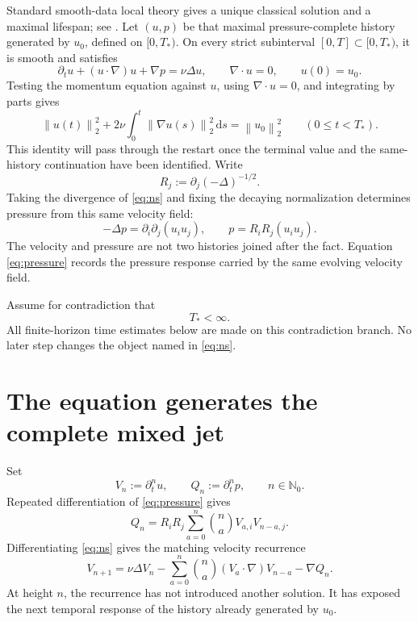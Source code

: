 \documentclass[11pt,letterpaper]{article}
\theoremstyle{definition}
\theoremstyle{remark}
\newcommand{\Nzero}{\mathbb N_0}
\newcommand{\norm}[1]{\left\lVert #1\right\rVert}
\newcommand{\dd}{\,\mathrm d}
\begin{document}
Standard smooth-data local theory gives a unique classical solution and a
maximal lifespan; see \cite{FujitaKato1964,Kato1984}.  Let \((u,p)\) be that
maximal pressure-complete history generated by \(u_0\), defined on
\([0,T_*)\).  On every strict subinterval \([0,T]\subset[0,T_*)\), it is
smooth and satisfies
\begin{equation}
\partial_tu+(u\cdot\nabla)u+\nabla p=\nu\Delta u,
\qquad
\nabla\cdot u=0,
\qquad
u(0)=u_0.
\label{eq:ns}
\end{equation}
Testing the momentum equation against \(u\), using
\(\nabla\cdot u=0\), and integrating by parts gives
\begin{equation}
\norm{u(t)}_2^2
+2\nu\int_0^t\norm{\nabla u(s)}_2^2\dd s
=\norm{u_0}_2^2
\qquad(0\le t<T_*).
\label{eq:energy-before-endpoint}
\end{equation}
This identity will pass through the restart once the terminal value and the
same-history continuation have been identified.
Write
\[
R_j:=\partial_j(-\Delta)^{-1/2}.
\]
Taking the divergence of \eqref{eq:ns} and fixing the decaying normalization
determines pressure from this same velocity field:
\begin{equation}
-\Delta p=\partial_i\partial_j(u_i u_j),
\qquad
p=R_iR_j(u_i u_j).
\label{eq:pressure}
\end{equation}
The velocity and pressure are not two histories joined after the fact.
Equation \eqref{eq:pressure} records the pressure response carried by the
same evolving velocity field.

Assume for contradiction that
\[
T_*<\infty.
\]
All finite-horizon time estimates below are made on this contradiction
branch.  No later step changes the object named in \eqref{eq:ns}.

\section{The equation generates the complete mixed jet}

Set
\[
V_n:=\partial_t^n u,
\qquad
Q_n:=\partial_t^n p,
\qquad n\in\Nzero.
\]
Repeated differentiation of \eqref{eq:pressure} gives
\begin{equation}
Q_n
=R_iR_j\sum_{a=0}^{n}\binom{n}{a}V_{a,i}V_{n-a,j}.
\label{eq:pressure-recurrence}
\end{equation}
Differentiating \eqref{eq:ns} gives the matching velocity recurrence
\begin{equation}
V_{n+1}
=\nu\Delta V_n
-\sum_{a=0}^{n}\binom{n}{a}(V_a\cdot\nabla)V_{n-a}
-\nabla Q_n.
\label{eq:velocity-recurrence}
\end{equation}
At height \(n\), the recurrence has not introduced another solution.  It has
exposed the next temporal response of the history already generated by
\(u_0\).
\end{document}
